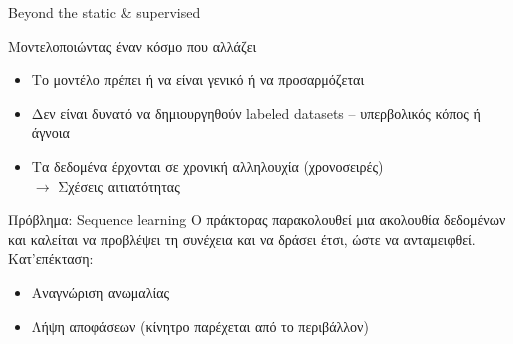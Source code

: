 \documentclass[11pt,center]{beamer}
\begin{document}
\begin{frame}{Beyond the static \& supervised}
  \begin{block}{Μοντελοποιώντας έναν κόσμο που αλλάζει}
	\pause
	\vspace{-0.5em}
	\begin{itemize}
	  \item Το μοντέλο πρέπει ή να είναι γενικό ή να προσαρμόζεται
	  \item Δεν είναι δυνατό να δημιουργηθούν labeled datasets -- υπερβολικός κόπος ή άγνοια
	  \pause
	  \item Τα δεδομένα έρχονται σε χρονική αλληλουχία (χρονοσειρές) \\ $\rightarrow$ Σχέσεις αιτιατότητας
	\end{itemize}
  \end{block}

  \pause
  \vspace{-0.5em}
  \begin{block}{Πρόβλημα: Sequence learning}
	Ο πράκτορας παρακολουθεί μια ακολουθία δεδομένων και καλείται να προβλέψει τη συνέχεια και να δράσει έτσι, ώστε να ανταμειφθεί. \\
	Κατ'επέκταση:
	\vspace{-0.3em}
	\begin{itemize}
	  \item Αναγνώριση ανωμαλίας
	  \item Λήψη αποφάσεων (κίνητρο παρέχεται από το περιβάλλον)
	\end{itemize}
  \end{block}
\end{frame}
\end{document}
